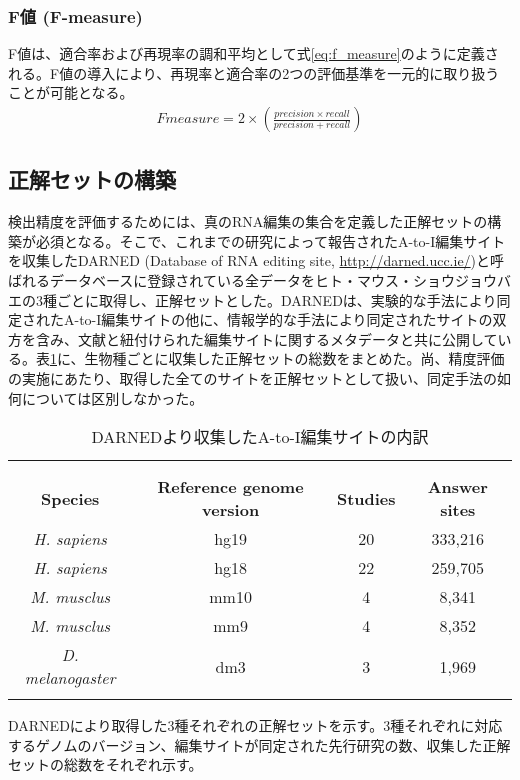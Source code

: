\subsubsection{F値 (F-measure)}
F値は、適合率および再現率の調和平均として式\ref{eq:f_measure}のように定義される。F値の導入により、再現率と適合率の2つの評価基準を一元的に取り扱うことが可能となる。
\begin{eqnarray}
	Fmeasure = 2 \times \left( \frac{precision \times recall}{precision + recall} \right)
	\label{eq:f_measure}
\end{eqnarray}

\subsection{正解セットの構築}
検出精度を評価するためには、真のRNA編集の集合を定義した正解セットの構築が必須となる。そこで、これまでの研究によって報告されたA-to-I編集サイトを収集したDARNED (Database of RNA editing site, \url{http://darned.ucc.ie/})と呼ばれるデータベースに登録されている全データをヒト・マウス・ショウジョウバエの3種ごとに取得し、正解セットとした。DARNEDは、実験的な手法により同定されたA-to-I編集サイトの他に、情報学的な手法により同定されたサイトの双方を含み、文献と紐付けられた編集サイトに関するメタデータと共に公開している。表\ref{tab:darned}に、生物種ごとに収集した正解セットの総数をまとめた。尚、精度評価の実施にあたり、取得した全てのサイトを正解セットとして扱い、同定手法の如何については区別しなかった。

\begin{longtable}{cccc}
	\vspace{-0.5cm}
	\label{tab:darned}\\
	\caption{DARNEDより収集したA-to-I編集サイトの内訳}\\
	\cline{1-4}
	\textbf{Species} & \textbf{Reference genome version} & \textbf{Studies} & \textbf{Answer sites} \\
	\cline{1-4}
	\textit{H. sapiens} & hg19 & 20  & 333,216 \\
	\textit{H. sapiens} & hg18 & 22  & 259,705 \\
	\textit{M. musclus} & mm10 & 4   & 8,341 \\
	\textit{M. musclus} & mm9  & 4   & 8,352 \\
	\textit{D. melanogaster}   & dm3 & 3 & 1,969 \\
	\cline{1-4}
	\vspace{-0.8cm}
\end{longtable}
\begin{flushleft}
	\small{DARNEDにより取得した3種それぞれの正解セットを示す。3種それぞれに対応するゲノムのバージョン、編集サイトが同定された先行研究の数、収集した正解セットの総数をそれぞれ示す。}
\end{flushleft}

